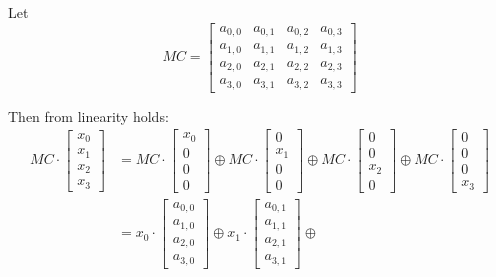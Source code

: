 \documentclass[11pt,oneside,final]{fithesis2}
\begin{document}
    Let 
    \begin{equation}
        MC = \begin{bmatrix} 
	a_{0,0} & a_{0,1} & a_{0,2} & a_{0,3}  \\
	a_{1,0} & a_{1,1} & a_{1,2} & a_{1,3}  \\
	a_{2,0} & a_{2,1} & a_{2,2} & a_{2,3}  \\
	a_{3,0} & a_{3,1} & a_{3,2} & a_{3,3}
     \end{bmatrix} 
     \end{equation}

    Then from linearity holds:
    \begin{equation} \label{eq:mmul_linearity}
    \begin{aligned}
    MC \cdot \begin{bmatrix}
	x_0\\
	x_1\\
	x_2\\
	x_3
    \end{bmatrix} &= MC \cdot \begin{bmatrix} x_0 \\ 0   \\ 0    \\ 0   \end{bmatrix} \oplus 
		     MC \cdot \begin{bmatrix} 0   \\ x_1 \\ 0    \\ 0   \end{bmatrix} \oplus 
		     MC \cdot \begin{bmatrix} 0   \\ 0   \\ x_2  \\ 0   \end{bmatrix} \oplus
		     MC \cdot \begin{bmatrix} 0   \\ 0   \\ 0    \\ x_3 \end{bmatrix} \\ 
                 &= x_0 \cdot \begin{bmatrix} a_{0,0} \\ a_{1,0} \\ a_{2,0} \\ a_{3,0} \end{bmatrix} \oplus
		    x_1 \cdot \begin{bmatrix} a_{0,1} \\ a_{1,1} \\ a_{2,1} \\ a_{3,1} \end{bmatrix} \oplus

\end{aligned}
\end{equation}
\end{document}
